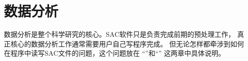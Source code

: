 \section{数据分析}
数据分析是整个科学研究的核心。SAC软件只是负责完成前期的预处理工作，
真正核心的数据分析工作通常需要用户自己写程序完成。
但无论怎样都牵涉到如何在程序中读写SAC文件的问题，这个问题放在
``''和``''
这两章中具体说明。
